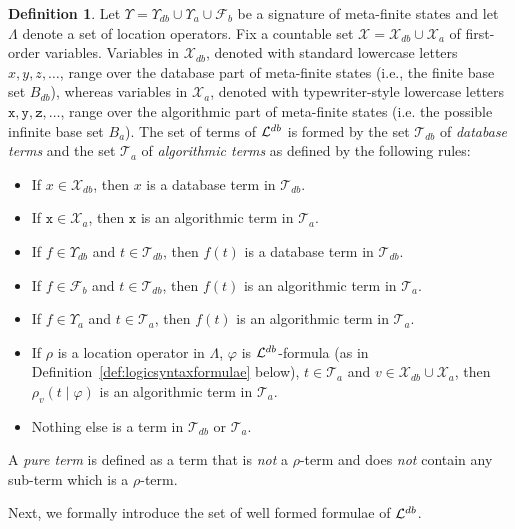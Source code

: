 \documentclass[preprint,11pt]{elsarticle}
\theoremstyle{definition}
\newtheorem{definition}{Definition}[section]
\theoremstyle{remark}
\begin{document}
\begin{definition}\label{def-meta-finitelogic-term-formula}
Let $\Upsilon=\Upsilon_{db}\cup\Upsilon_a\cup\mathcal{F}_b$ be a
signature of meta-finite states and let $\Lambda$ denote a set of location operators. Fix a countable set $\mathcal{X} = \mathcal{X}_{db} \cup \mathcal{X}_a$ of first-order variables. Variables in $\mathcal{X}_{db}$, denoted with standard lowercase letters $x, y, z , \ldots$, range over the database part of meta-finite states (i.e., the finite base set $B_{db}$), whereas variables in $\mathcal{X}_a$, denoted with typewriter-style lowercase letters $\texttt{x}, \texttt{y}, \texttt{z}, \ldots$, range over the algorithmic part of meta-finite states (i.e. the possible infinite base set $B_a$). 
The set of terms of ${\cal L}^{db}$ is formed by the set $\mathcal{T}_{db}$ of \emph{database terms} and the set
$\mathcal{T}_{a}$ of \emph{algorithmic terms} as defined by the following rules:
\begin{itemize}
    \item If $x\in \mathcal{X}_{db}$, then $x$ is a database term in $\mathcal{T}_{db}$.
    \item If $\texttt{x}\in \mathcal{X}_{a}$, then $\texttt{x}$ is an algorithmic term in $\mathcal{T}_{a}$. 
    \item If $f \in \Upsilon_{db}$ and $t \in \mathcal{T}_{db}$, then $f(t)$ is a database term in $\mathcal{T}_{db}$.
    \item If $f\in \mathcal{F}_b$ and $t \in \mathcal{T}_{db}$, then $f(t)$ is an algorithmic term in $\mathcal{T}_{a}$.
    \item If $f\in \Upsilon_{a}$ and $t \in \mathcal{T}_{a}$, then $f(t)$ is an algorithmic term in $\mathcal{T}_{a}$.
    \item If $\rho$ is a location operator in $\Lambda$, $\varphi$ is ${\cal L}^{db}$-formula (as in Definition~\ref{def:logicsyntaxformulae} below), $t\in \mathcal{T}_{a}$ and $v \in \mathcal{X}_{db} \cup \mathcal{X}_{a}$, then $\rho_{v}(t \mid \varphi)$ is an algorithmic term in $\mathcal{T}_{a}$.
    \item Nothing else is a term in $\mathcal{T}_{db}$ or $\mathcal{T}_{a}$.  
    \end{itemize}
\end{definition}

A \emph{pure term} is defined as a term that is \emph{not} a $\rho$-term and does \emph{not} contain any sub-term which is a $\rho$-term. 

Next, we formally introduce the set of well formed formulae of ${\cal L}^{db}$. 
\end{document}
